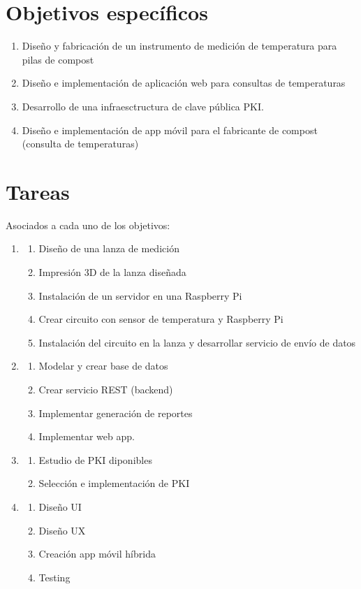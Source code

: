 \documentclass[12pt, letterpaper]{article}
\begin{document}
\section{Objetivos específicos}
\begin{enumerate}
	\item Diseño y fabricación de un instrumento de medición de temperatura para pilas de compost 
	\item Diseño e implementación de aplicación web para consultas de temperaturas
	\item Desarrollo de una infraesctructura de clave pública PKI.
	\item Diseño e implementación de app móvil para el fabricante de compost (consulta de temperaturas)
\end{enumerate}
\section{Tareas}
Asociados a cada uno de los objetivos:
\begin{enumerate}
	\item
	\begin{enumerate}
		\item Diseño de una lanza de medición
		\item Impresión 3D de la lanza diseñada
		\item Instalación de un servidor en una Raspberry Pi
		\item Crear circuito con sensor de temperatura y Raspberry Pi
		\item Instalación del circuito en la lanza y desarrollar servicio de envío de datos
	\end{enumerate}
	\item
	\begin{enumerate}
		\item Modelar y crear base de datos
		\item Crear servicio REST (backend)
		\item Implementar generación de reportes
		\item Implementar web app.
	\end{enumerate}
	\item
	\begin{enumerate}
		\item Estudio de PKI diponibles
		\item Selección e implementación de PKI
	\end{enumerate}
	\item
	\begin{enumerate}
		\item Diseño UI
		\item Diseño UX
		\item Creación app móvil híbrida
		\item Testing
		
	\end{enumerate}
\end{enumerate}
\end{document}
